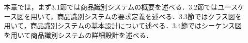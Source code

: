 

本章では，まず3.1節では商品識別システムの概要を述べる．3.2節ではユースケース図を用いて，商品識別システムの要求定義を述べる．3.3節ではクラス図を用いて，商品識別システムの基本設計について述べる．3.4節ではシーケンス図を用いて商品識別システムの詳細設計を述べる．